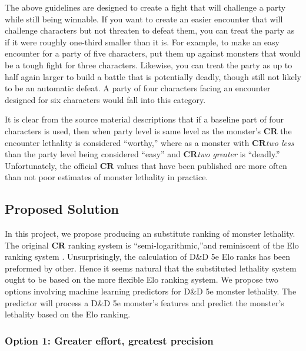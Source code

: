\documentclass{article}
\newcommand{\CR}{\ensuremath{\mathbf{CR}}\xspace}
\newcommand{\DnD}{D\&D 5e\xspace}
\newcommand{\TierLeast}{\ensuremath{\textsc{Least}}\xspace}
\newcommand{\TierLess}{\ensuremath{\textsc{Less}}\xspace}
\newcommand{\TierFair}{\ensuremath{\textsc{Fair}}\xspace}
\newcommand{\TierMore}{\ensuremath{\textsc{More}}\xspace}
\newcommand{\TierMost}{\ensuremath{\textsc{Most}}\xspace}
\begin{document}
\begin{displayquote}
	The above guidelines are designed to create a fight that will challenge a party while still being winnable.
	If you want to create an easier encounter that will challenge characters but not threaten to defeat them, you can treat the party as if it were roughly one-third smaller than it is.
	For example, to make an easy encounter for a party of five characters, put them up against monsters that would be a tough fight for three characters.
	Likewise, you can treat the party as up to half again larger to build a battle that is potentially deadly, though still not likely to be an automatic defeat.
	A party of four characters facing an encounter designed for six characters would fall into this category.
\end{displayquote}

It is clear from the source material descriptions that if a baseline part of four characters is used, then when party level is same level as the monster's \CR the encounter lethality is considered ``worthy,'' where as a monster with \CR \emph{two less} than the party level being considered ``easy'' and \CR \emph{two greater} is ``deadly.''
Unfortunately, the official \CR values that have been published are more often than not poor estimates of monster lethality in practice.


\subsection{Proposed Solution}

In this project, we propose producing an substitute ranking of monster lethality.
The original \CR ranking system is ``semi-logarithmic,''and reminiscent of the Elo ranking system \cite{elo1978rating}.
Unsurprisingly, the calculation of \DnD Elo ranks has been preformed by other.
Hence it seems natural that the substituted lethality system ought to be based on the more flexible Elo ranking system.
We propose two options involving machine learning predictors for \DnD monster lethality.
The predictor will process a \DnD monster's features and predict the monster's lethality based on the Elo ranking.


\subsubsection{Option 1: Greater effort, greatest precision}
\end{document}

